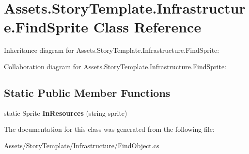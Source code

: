 \hypertarget{classAssets_1_1StoryTemplate_1_1Infrastructure_1_1FindSprite}{}\section{Assets.\+Story\+Template.\+Infrastructure.\+Find\+Sprite Class Reference}
\label{classAssets_1_1StoryTemplate_1_1Infrastructure_1_1FindSprite}


Inheritance diagram for Assets.\+Story\+Template.\+Infrastructure.\+Find\+Sprite\+:


Collaboration diagram for Assets.\+Story\+Template.\+Infrastructure.\+Find\+Sprite\+:
\subsection*{Static Public Member Functions}
\begin{DoxyCompactItemize}
\item 
static Sprite {\bfseries In\+Resources} (string sprite)\hypertarget{classAssets_1_1StoryTemplate_1_1Infrastructure_1_1FindSprite_a052bce215c4d02aa9f3fa9dba9e22ab6}{}\label{classAssets_1_1StoryTemplate_1_1Infrastructure_1_1FindSprite_a052bce215c4d02aa9f3fa9dba9e22ab6}

\end{DoxyCompactItemize}


The documentation for this class was generated from the following file\+:\begin{DoxyCompactItemize}
\item 
Assets/\+Story\+Template/\+Infrastructure/Find\+Object.\+cs\end{DoxyCompactItemize}
